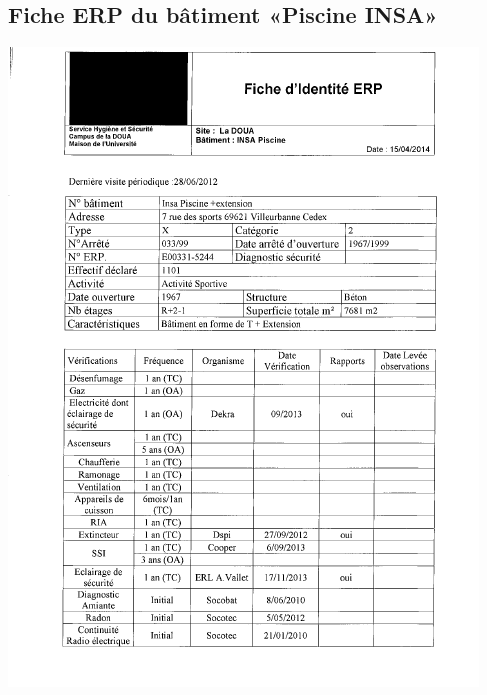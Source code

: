 \documentclass[hidelinks, paper=a4, fontsize=13pt]{report}
\begin{document}
\subsection{Fiche ERP du bâtiment «Piscine INSA»}
\begin{center}
\includegraphics[scale=1.2]{Annexes/Documents/ERPPiscine}
\end{center}
\end{document}

